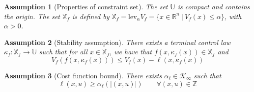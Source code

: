 \documentclass{article}
\newtheorem{assumption}{Assumption}
\newcommand{\abs}[1]{\left\lvert #1 \right\rvert}
\newcommand{\lev}{\text{lev}}
\begin{document}
\begin{assumption}[Properties of constraint set]
\label{as:constraints}
The set $\mathbb{U}$ is compact and contains the origin. 
The set $\mathbb{X}_f$ is defined by  $\mathbb{X}_f= \lev_\alpha V_f = \{x \in \mathbb{R}^n \ | \ 
V_f(x) \leq \alpha\}$, with $\alpha > 0$.
\end{assumption}
\begin{assumption}[Stability assumption]
\label{as:terminalstability}
There exists a terminal control law $\kappa_f:\mathbb{X}_f \rightarrow
\mathbb{U}$ such that for all $x \in \mathbb{X}_f$, we have that $f(x,\kappa_f(x)) \in \mathbb{X}_f$ and 
\begin{equation*}
V_f(f(x,\kappa_f(x))) \leq V_f(x)-\ell(x,\kappa_f(x))
\end{equation*}
\end{assumption}
\begin{assumption}[Cost function bound]
\label{as:pdstagecost}
There exists $\alpha_\ell \in \mathcal{K}_\infty$ such that
\begin{equation*}
\ell(x,u) \geq \alpha_\ell(\abs{(x,u)}) \quad \quad \forall (x,u) \in \mathbb{Z}
\end{equation*}
\end{assumption}

\end{document}
